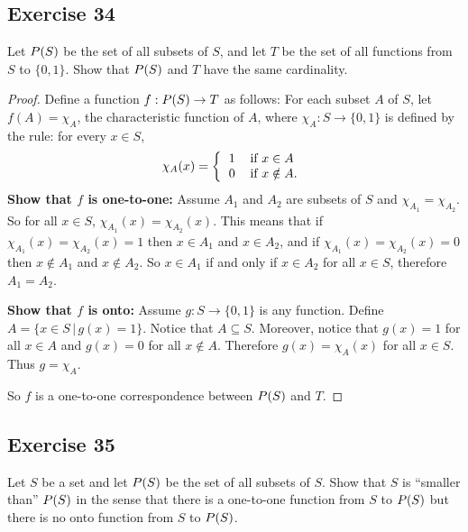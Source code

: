 \documentclass[14pt]{extarticle}
\let\mathscr\relax
\newcommand{\ps}{\mathscr{P}} %
\begin{document}
\subsection{Exercise 34}
Let \(\ps(S)\) be the set of all subsets of $S$, and let $T$ be the set of all functions from $S$ to \(\{0,1\}\).
Show that \(\ps(S)\) and $T$ have the same cardinality.

\begin{proof}
    Define a function \(f: \ps(S) \to T\) as follows: For each subset $A$ of $S$, let \(f(A)=\chi_A\), the characteristic
    function of $A$, where \(\chi_A: S \to \{0, 1\}\) is defined by the rule: for every \(x \in S\),
    \[
        \chi_A(x) =
        \left\{
        \begin{tabular}{ll}
            1 & if \(x \in A\)     \\
            0 & if \(x \notin A\).
        \end{tabular}
        \right.
    \]
    {\bf Show that $f$ is one-to-one:} Assume $A_1$ and $A_2$ are subsets of $S$ and \(\chi_{A_1} = \chi_{A_2}\). So for
    all \(x \in S\), \(\chi_{A_1}(x) = \chi_{A_2}(x)\). This means that if \(\chi_{A_1}(x) = \chi_{A_2}(x) = 1\) then
    \(x \in A_1\) and \(x \in A_2\), and if \(\chi_{A_1}(x) = \chi_{A_2}(x) = 0\) then \(x \notin A_1\) and \(x \notin
    A_2\). So \(x \in A_1\) if and only if \(x \in A_2\) for all \(x \in S\), therefore \(A_1 = A_2\).

        {\bf Show that $f$ is onto:} Assume \(g: S \to \{0, 1\}\) is any function. Define \(A = \{x \in S \, | \, g(x)=1\}\).
    Notice that \(A \subseteq S\). Moreover, notice that \(g(x) = 1\) for all \(x \in A\) and \(g(x) = 0\) for all
    \(x \notin A\). Therefore \(g(x) = \chi_A(x)\) for all \(x \in S\). Thus \(g = \chi_A\).

    So $f$ is a one-to-one correspondence between \(\ps(S)\) and $T$.
\end{proof}

\subsection{Exercise 35}
Let $S$ be a set and let \(\ps(S)\) be the set of all subsets of $S$. Show that $S$ is “smaller than” \(\ps(S)\)
in the sense that there is a one-to-one function from $S$ to \(\ps(S)\) but there is no onto function from $S$ to
\(\ps(S)\).
\end{document}
